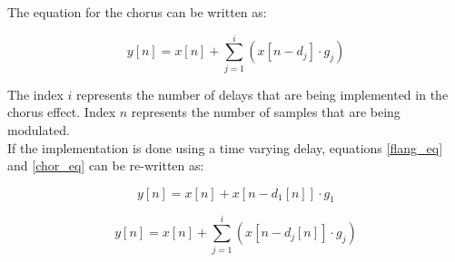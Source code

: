 The equation for the chorus can be written as:

\begin{equation}
\label{chor_eq}
y[n] = x[n] + \sum_{j=1}^{i}  (x[n- d_{j}] \cdot g_{j})
\end{equation}

The index $i$ represents the number of delays that are being implemented in the chorus effect. Index $n$ represents the number of samples that are being modulated. \\
If the implementation is done using a time varying delay, equations \ref{flang_eq} and \ref{chor_eq} can be re-written as:

\begin{equation}
\label{flang_eq2}
y[n] = x[n] + x[n- d_{1}[n]] \cdot g_{1}  
\end{equation}

\begin{equation}
\label{chor_eq2}
y[n] = x[n] + \sum_{j=1}^{i}  (x[n- d_{j}[n]] \cdot g_{j})
\end{equation}